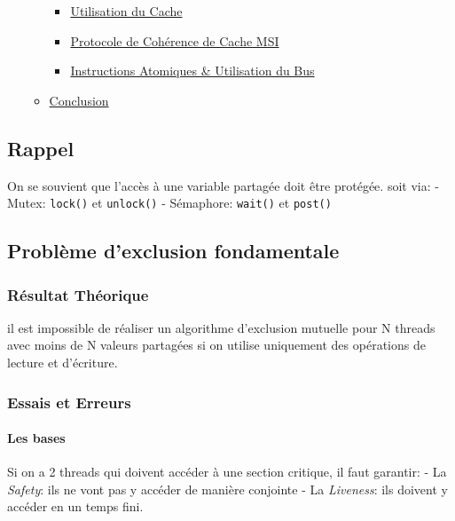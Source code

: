 \begin{itemize}
\begin{itemize}
    \begin{itemize}
    \tightlist
    \item
      \hyperref[utilisation-du-cache]{Utilisation du Cache}
    \item
      \hyperref[protocole-de-cohuxe9rence-de-cache-msi]{Protocole de
      Cohérence de Cache MSI}
    \item
      \hyperref[instructions-atomiques--utilisation-du-bus]{Instructions
      Atomiques \& Utilisation du Bus}
    \end{itemize}
  \item
    \hyperref[conclusion]{Conclusion}
  \end{itemize}
\end{itemize}

\subsection{Rappel}\label{rappel}

On se souvient que l'accès à une variable partagée doit être protégée.
soit via: - Mutex: \texttt{lock()} et \texttt{unlock()} - Sémaphore:
\texttt{wait()} et \texttt{post()}

\subsection{Problème d'exclusion
fondamentale}\label{probluxe8me-dexclusion-fondamentale}

\subsubsection{Résultat Théorique}\label{ruxe9sultat-thuxe9orique}

il est impossible de réaliser un algorithme d'exclusion mutuelle pour N
threads avec moins de N valeurs partagées si on utilise uniquement des
opérations de lecture et d'écriture.

\subsubsection{Essais et Erreurs}\label{essais-et-erreurs}

\paragraph{Les bases}\label{les-bases}

Si on a 2 threads qui doivent accéder à une section critique, il faut
garantir: - La \emph{Safety}: ils ne vont pas y accéder de manière
conjointe - La \emph{Liveness}: ils doivent y accéder en un temps fini.


